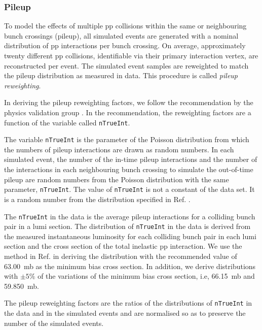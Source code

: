 \subsubsection{Pileup}
\label{sec:pileup-reweighting}

To model the effects of multiple pp collisions within the same or
neighbouring bunch crossings (pileup), all simulated events are
generated with a nominal distribution of pp interactions per bunch
crossing. On average, approximately twenty different pp collisions,
identifiable via their primary interaction vertex, are reconstructed
per event. The simulated event samples are reweighted to match the
pileup distribution as measured in data. This procedure is called
\textit{pileup reweighting}.

In deriving the pileup reweighting factors, we follow the
recommendation by the physics validation group
\cite{twiki-PdmVPileUpDescription, twiki-PileupJSONFileforData}. In
the recommendation, the reweighting factors are a function of the
variable called \verb!nTrueInt!.

The variable \verb!nTrueInt! is the parameter of the Poisson
distribution from which the numbers of pileup interactions are drawn
as random numbers. In each simulated event, the number of the in-time
pileup interactions and the number of the interactions in each
neighbouring bunch crossing to simulate the out-of-time pileup are
random numbers from the Poisson distribution with the same parameter,
\verb!nTrueInt!. The value of \verb!nTrueInt! is not a constant of the
data set. It is a random number from the distribution specified in
Ref. \cite{github-mix_2016_25ns_SpringMC_PUScenarioV1_PoissonOOTPU_cfi}.

The \verb!nTrueInt! in the data is the average pileup interactions for
a colliding bunch pair in a lumi section. The distribution of
\verb!nTrueInt! in the data is derived from the measured instantaneous
luminosity for each colliding bunch pair in each lumi section and the
cross section of the total inelastic pp interaction. We use the method
in Ref. \cite{twiki-PileupJSONFileforData} in deriving the
distribution with the recommended value of 63.00~mb as the minimum
bias cross section. In addition, we derive distributions with $\pm
5\%$ of the variations of the minimum bias cross section, i.e,
66.15~mb and 59.850~mb.

The pileup reweighting factors are the ratios of the distributions of
\verb!nTrueInt! in the data and in the simulated events and are
normalised so as to preserve the number of the simulated events.

